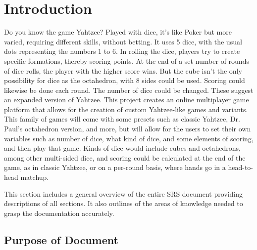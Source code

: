 \section{Introduction}


Do you know the game Yahtzee? Played with dice, it's like Poker but more varied, requiring different skills, without betting. It uses 5 dice, with the usual dots representing the numbers 1 to 6. In rolling the dice, players try to create specific formations, thereby scoring points. At the end of a set number of rounds of dice rolls, the player with the higher score wins.
But the cube isn't the only possibility for dice as the octahedron, with 8 sides could be used. Scoring could likewise be done each round. The number of dice could be changed. These suggest an expanded version of Yahtzee.
This project creates an online multiplayer game platform that allows for the creation of custom Yahtzee-like games and variants. This family of games will come with some presets such as classic Yahtzee, Dr. Paul's octahedron version, and more, but will allow for the users to set their own variables such as number of dice, what kind of dice, and some elements of scoring, and then play that game. Kinds of dice would include cubes and octahedrons, among other multi-sided dice, and scoring could be calculated at the end of the game, as in classic Yahtzee, or on a per-round basis, where hands go in a head-to-head matchup.

This section includes a general overview of the entire SRS document providing descriptions of all sections. It also outlines of the areas of knowledge needed to grasp the documentation accurately.

\subsection{Purpose of Document}



